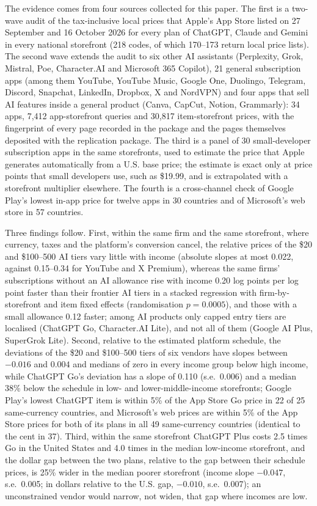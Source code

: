 \documentclass[11pt]{article}
\theoremstyle{definition}
\theoremstyle{remark}
\begin{document}
The evidence comes from four sources collected for this paper. The first is a two-wave audit of the tax-inclusive local prices that Apple's App Store listed on 27 September and 16 October 2026 for every plan of ChatGPT, Claude and Gemini in every national storefront (218 codes, of which 170--173 return local price lists). The second wave extends the audit to six other AI assistants (Perplexity, Grok, Mistral, Poe, Character.AI and Microsoft 365 Copilot), 21 general subscription apps (among them YouTube, YouTube Music, Google One, Duolingo, Telegram, Discord, Snapchat, LinkedIn, Dropbox, X and NordVPN) and four apps that sell AI features inside a general product (Canva, CapCut, Notion, Grammarly): 34 apps, 7,412 app-storefront queries and 30,817 item-storefront prices, with the fingerprint of every page recorded in the package and the pages themselves deposited with the replication package. The third is a panel of 30 small-developer subscription apps in the same storefronts, used to estimate the price that Apple generates automatically from a U.S. base price; the estimate is exact only at price points that small developers use, such as \$19.99, and is extrapolated with a storefront multiplier elsewhere. The fourth is a cross-channel check of Google Play's lowest in-app price for twelve apps in 30 countries and of Microsoft's web store in 57 countries.

Three findings follow. First, within the same firm and the same storefront, where currency, taxes and the platform's conversion cancel, the relative prices of the \$20 and \$100--500 AI tiers vary little with income (absolute slopes at most 0.022, against 0.15--0.34 for YouTube and X Premium), whereas the same firms' subscriptions without an AI allowance rise with income 0.20 log points per log point faster than their frontier AI tiers in a stacked regression with firm-by-storefront and item fixed effects (randomisation $p=0.0005$), and those with a small allowance 0.12 faster; among AI products only capped entry tiers are localised (ChatGPT Go, Character.AI Lite), and not all of them (Google AI Plus, SuperGrok Lite). Second, relative to the estimated platform schedule, the deviations of the \$20 and \$100--500 tiers of six vendors have slopes between $-0.016$ and $0.004$ and medians of zero in every income group below high income, while ChatGPT Go's deviation has a slope of 0.110 (s.e.\ 0.006) and a median 38\% below the schedule in low- and lower-middle-income storefronts; Google Play's lowest ChatGPT item is within 5\% of the App Store Go price in 22 of 25 same-currency countries, and Microsoft's web prices are within 5\% of the App Store prices for both of its plans in all 49 same-currency countries (identical to the cent in 37). Third, within the same storefront ChatGPT Plus costs 2.5 times Go in the United States and 4.0 times in the median low-income storefront, and the dollar gap between the two plans, relative to the gap between their schedule prices, is 25\% wider in the median poorer storefront (income slope $-0.047$, s.e.\ 0.005; in dollars relative to the U.S. gap, $-0.010$, s.e.\ 0.007); an unconstrained vendor would narrow, not widen, that gap where incomes are low.
\end{document}

